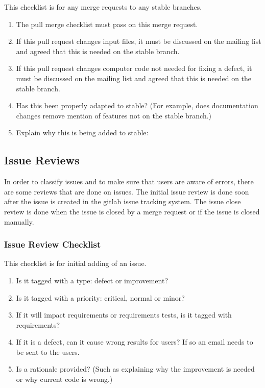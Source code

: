 \documentclass{article}
\begin{document}
This checklist is for any merge requests to any stable branches.

\begin{enumerate}
\item  The pull merge checklist must pass on this merge request.
\item  If this pull request changes input files, it must be discussed on the mailing list and agreed that this is needed on the stable branch.
\item  If this pull request changes computer code not needed for fixing a defect, it must be discussed on the mailing list and agreed that this is needed on the stable branch.
\item  Has this been properly adapted to stable? (For example, does documentation changes remove mention of features not on the stable branch.)
\item  Explain why this is being added to stable:
\end{enumerate}

\subsection{Issue Reviews}

In order to classify issues and to make sure that users are aware of
errors, there are some reviews that are done on issues.  The initial
issue review is done soon after the issue is created in the gitlab
issue tracking system.  The issue close review is done when the issue
is closed by a merge request or if the issue is closed manually.

\subsubsection{Issue Review Checklist}

This checklist is for initial adding of an issue.

\begin{enumerate}
\item  Is it tagged with a type: defect or improvement?
\item  Is it tagged with a priority: critical, normal or minor?
\item  If it will impact requirements or requirements tests, is it tagged with requirements?
\item  If it is a defect, can it cause wrong results for users? If so an email needs to be sent to the users.
\item  Is a rationale provided? (Such as explaining why the improvement is needed or why current code is wrong.)
\end{enumerate}
\end{document}

